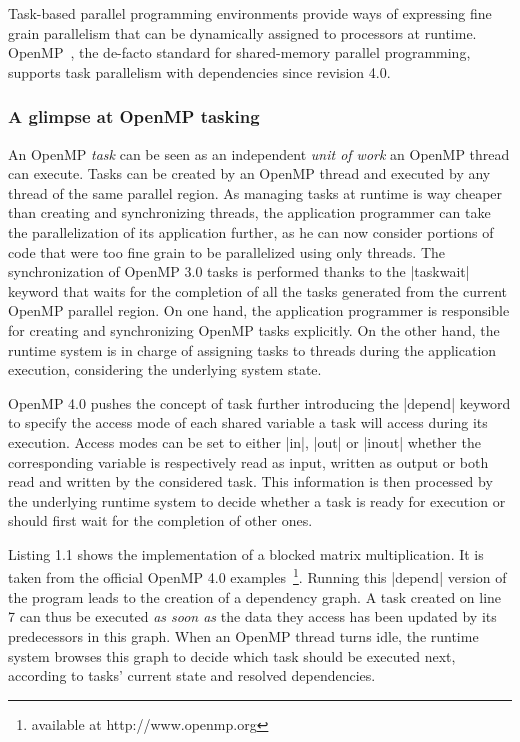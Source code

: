 \documentclass{Styles/llncs}
\begin{document}
Task-based parallel programming environments provide ways of expressing fine grain parallelism that can be dynamically assigned to processors at runtime.
OpenMP~\cite{openmp40}, the de-facto standard for shared-memory parallel programming, supports task parallelism with dependencies since revision 4.0.

\subsubsection{A glimpse at OpenMP tasking}

An OpenMP \emph{task} can be seen as an independent \emph{unit of work} an OpenMP thread can execute.
Tasks can be created by an OpenMP thread and executed by any thread of the same parallel region. 
As managing tasks at runtime is way cheaper than creating and synchronizing threads, the application programmer can take the parallelization of its application further, as he can now consider portions of code that were too fine grain to be parallelized using only threads.
The synchronization of OpenMP 3.0 tasks is performed thanks to the |taskwait| keyword that waits for the completion of all the tasks generated from the current OpenMP parallel region.
On one hand, the application programmer is responsible for creating and synchronizing OpenMP tasks explicitly. 
On the other hand, the runtime system is in charge of assigning tasks to threads during the application execution, considering the underlying system state.

OpenMP 4.0 pushes the concept of task further introducing the |depend| keyword to specify the access mode of each shared variable a task will access during its execution. 
Access modes can be set to either |in|, |out| or |inout| whether the corresponding variable is respectively read as input, written as output or both read and written by the considered task. 
This information is then processed by the underlying runtime system to decide whether a task is ready for execution or should first wait for the completion of other ones.

Listing 1.1 shows the implementation of a blocked matrix multiplication. It is
taken from the official OpenMP 4.0 examples~\footnote{available at http://www.openmp.org}.
Running this |depend| version of the program leads to the creation of a dependency graph.
A task created on line 7 can thus be executed \emph{as soon as} the data they access has been updated by its predecessors in this graph.
When an OpenMP thread turns idle, the runtime system browses this graph to decide which task should be executed next, according to tasks' current state and resolved dependencies.
\end{document}
